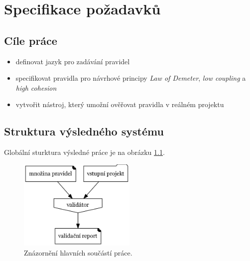 \chapter{Specifikace požadavků}


\section{Cíle práce}
\begin{itemize}
\item definovat jazyk pro zadávání pravidel
\item specifikovat pravidla pro návrhové principy \emph{Law of Demeter}, \emph{low coupling} a \emph{high cohesion}
\item vytvořit nástroj, který umožní ověřovat pravidla v reálném projektu
\end{itemize}

\section{Struktura výsledného systému}
Globální sturktura výsledné práce je na obrázku \ref{global_structure}.

\begin{figure}[h!]
  \centering
  \includegraphics[width=0.5\textwidth]{./graphs/global_structure.png}
  \caption{Znázornění hlavních součástí práce.\label{global_structure}}
\end{figure}

